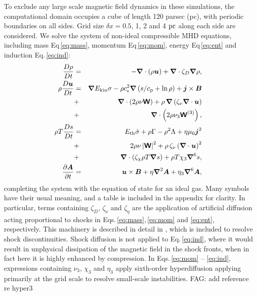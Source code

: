 \documentclass[preprint2]{aastex63}
\newcommand\ESK{E_{\rm kin}}
\newcommand\EST{E_{\rm th}}
\newcommand{\vect}[1]{{{\mbox{\boldmath $#1$}}}}%
\newcommand{\mathbfss}[1]{\textbf{\textsf{#1}}}
\newcommand\pc{~ {\rm pc}}
\newcommand{\fag}[1]{\textcolor{midgreen}{FAG: #1}}
\begin{document}
To exclude any large scale magnetic field dynamics in these simulations, the
computational domain occupies a cube of length 120 parsec (pc), with periodic boundaries
on all sides.
Grid size $\delta x=0.5$, 1, 2 and 4$\pc$  along each side are considered.
We solve the system of non-ideal compressible MHD equations, including 
mass Eq\,\eqref{eq:mass}, momentum Eq\,\eqref{eq:mom}, energy Eq\,\eqref{eq:ent} and
induction Eq.\,\eqref{eq:ind}:
  \begin{eqnarray}
  \label{eq:mass}
    \frac{D\rho}{Dt} &=& 
    -\vect\nabla \cdot (\rho \vect{u})
    +\vect\nabla \cdot\zeta_D\vect\nabla\rho,\\
  \label{eq:mom}
    \rho\frac{D\vect{u}}{Dt} &=& 
    \vect\nabla{\ESK\sigma}
    -\rho c_{\rm s}^2\vect\nabla\left({s}/{c_{\rm p}}+\ln\rho\right)
    +\vect{j}\times\vect{B}
    \nonumber\\
    &+&\vect\nabla\cdot \left(2\rho\nu{\mathbfss W}\right)
    +\rho\,\vect\nabla\left(\zeta_{\nu}\vect\nabla \cdot \vect{u} \right)
    \nonumber\\
    &+&\vect\nabla\cdot \left(2\rho\nu_3{\mathbfss W}^{(3)}\right),\\
  \label{eq:ent}
    \rho T\frac{D s}{Dt} &=&
     \EST\dot\sigma +\rho\Gamma
    -\rho^2\Lambda +\eta\mu_0\vect{j}^2 
    \nonumber\\
    &+&2 \rho \nu\left|{\mathbfss W}\right|^{2}
    +\rho\,\zeta_{\nu}\left(\vect\nabla \cdot \vect{u} \right)^2
    \nonumber\\
    &+&\vect\nabla\cdot\left(\zeta_\chi\rho T\vect\nabla s\right)
    +\rho T\chi_3\vect\nabla^6 s,\\
  \label{eq:ind}
    \frac{\partial \vect{A}}{\partial t} &=&
    \vect{u}\times\vect{B}
    +\eta\vect\nabla^2\vect{A}
    +\eta_3\vect\nabla^6\vect{A},
  \end{eqnarray}
completing the system with the equation of state for an ideal gas.
Many symbols have their usual meaning, and a table is included in the appendix
for clarity.
In particular, terms containing $\zeta_D,\,\zeta_\nu$ and $\zeta_\eta$ are the
application of artificial diffusion acting proportional to shocks in 
Eqs.\,\eqref{eq:mass},\,\eqref{eq:mom} and \eqref{eq:ent}, respectively.
This machinery is described in detail in \citet{GMKSH20}, which is included to
resolve shock discontinuities.
Shock diffusion is not applied to Eq.\,\eqref{eq:ind}, where it would result in 
unphysical dissipation of the magnetic field in the shock fronts, when in fact 
here it is highly enhanced by compression.
In Eqs.\,\eqref{eq:mom} -- \eqref{eq:ind}, expressions containing 
$\nu_3,\,\chi_3$ and $\eta_3$ apply sixth-order hyperdiffusion applying primarily
at the grid scale to resolve small-scale instabilities.
\fag{add reference re hyper3}
\end{document}
